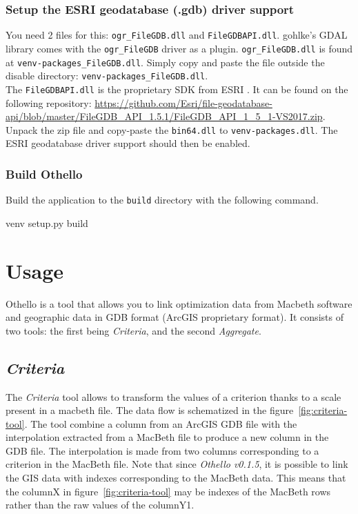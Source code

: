 \documentclass[11pt]{article}
\begin{document}
\subsubsection{Setup the ESRI geodatabase (.gdb) driver support}
\noindent You need 2 files for this: \texttt{ogr\_FileGDB.dll} and \texttt{FileGDBAPI.dll}.
gohlke's GDAL library comes with the \texttt{ogr\_FileGDB} driver as a plugin.
\texttt{ogr\_FileGDB.dll} is found at \texttt{venv\Lib\site-packages\osgeo\gdalplugins\disable\ogr\_FileGDB.dll}.
Simply copy and paste the file outside the disable directory: \texttt{venv\Lib\site-packages\osgeo\gdalplugins\ogr\_FileGDB.dll}. \\


\noindent The \texttt{FileGDBAPI.dll} is the proprietary SDK from ESRI .
It can be found on the following repository: \url{https://github.com/Esri/file-geodatabase-api/blob/master/FileGDB_API_1.5.1/FileGDB_API_1_5_1-VS2017.zip}.
Unpack the zip file and copy-paste the \texttt{bin64\FileGDPAPI.dll} to \texttt{venv\Lib\site-packages\osgeo\FileGDPAPI.dll}.
The ESRI geodatabase driver support should then be enabled.

\subsubsection{Build Othello}
\noindent Build the application to the \texttt{build} directory with the following command.
\begin{code}
venv\Scripts{} setup.py build
\end{code}


\newpage
\section{Usage}\label{sec:usage}
Othello is a tool that allows you to link optimization data from Macbeth software
and geographic data in GDB format (ArcGIS proprietary format).
It consists of two tools: the first being \textit{Criteria}, and the second \textit{Aggregate}.

\subsection{\textit{Criteria}}\label{subsec:criteria}
The \textit{Criteria} tool allows to transform the values of a criterion thanks
to a scale present in a macbeth file.
The data flow is schematized in the figure\ \ref{fig:criteria-tool}.
The tool combine a column from an ArcGIS GDB file
with the interpolation extracted from a MacBeth file to produce
a new column in the GDB file.
The interpolation is made from two columns corresponding to a criterion in the MacBeth file.
Note that since \textit{Othello v0.1.5}, it is possible to link the GIS data with
indexes corresponding to the MacBeth data.
This means that the columnX in figure\ \ref{fig:criteria-tool} may be indexes of the MacBeth
rows rather than the raw values of the columnY1.
\end{document}
